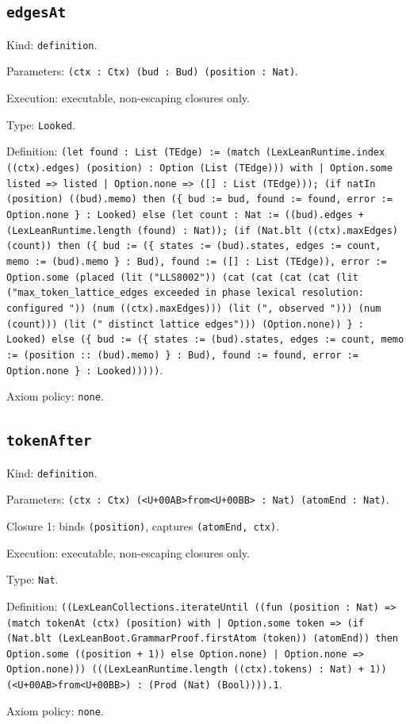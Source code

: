 \documentclass[11pt]{article}
\begin{document}
\subsection*{\texttt{edgesAt}}
\noindent Kind: \texttt{definition}.\par
\noindent Parameters: \texttt{(ctx : Ctx) (bud : Bud) (position : Nat)}.\par
\noindent Execution: executable, non-escaping closures only.\par
\noindent Type: \texttt{Looked}.\par
\noindent Definition: \texttt{(let found : List (TEdge) := (match (LexLeanRuntime.index ((ctx).edges) (position) : Option (List (TEdge))) with | Option.some listed => listed | Option.none => ([] : List (TEdge))); (if natIn (position) ((bud).memo) then (\{ bud := bud, found := found, error := Option.none \} : Looked) else (let count : Nat := ((bud).edges + (LexLeanRuntime.length (found) : Nat)); (if (Nat.blt ((ctx).maxEdges) (count)) then (\{ bud := (\{ states := (bud).states, edges := count, memo := (bud).memo \} : Bud), found := ([] : List (TEdge)), error := Option.some (placed (lit ("LLS8002")) (cat (cat (cat (cat (lit ("max\_token\_lattice\_edges exceeded in phase lexical resolution: configured ")) (num ((ctx).maxEdges))) (lit (", observed "))) (num (count))) (lit (" distinct lattice edges"))) (Option.none)) \} : Looked) else (\{ bud := (\{ states := (bud).states, edges := count, memo := (position :: (bud).memo) \} : Bud), found := found, error := Option.none \} : Looked)))))}.\par
\noindent Axiom policy: \texttt{none}.\par
\subsection*{\texttt{tokenAfter}}
\noindent Kind: \texttt{definition}.\par
\noindent Parameters: \texttt{(ctx : Ctx) (<U+00AB>from<U+00BB> : Nat) (atomEnd : Nat)}.\par
\noindent Closure 1: binds \texttt{(position)}, captures \texttt{(atomEnd, ctx)}.\par
\noindent Execution: executable, non-escaping closures only.\par
\noindent Type: \texttt{Nat}.\par
\noindent Definition: \texttt{((LexLeanCollections.iterateUntil ((fun (position : Nat) => (match tokenAt (ctx) (position) with | Option.some token => (if (Nat.blt (LexLeanBoot.GrammarProof.firstAtom (token)) (atomEnd)) then Option.some ((position + 1)) else Option.none) | Option.none => Option.none))) (((LexLeanRuntime.length ((ctx).tokens) : Nat) + 1)) (<U+00AB>from<U+00BB>) : (Prod (Nat) (Bool)))).1}.\par
\noindent Axiom policy: \texttt{none}.\par
\end{document}
